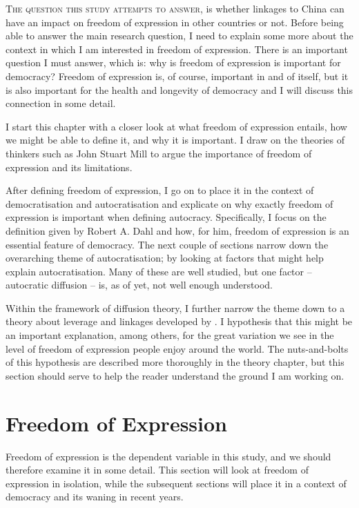 \lettrine{T}{he question this study attempts to answer}, is whether linkages to China can have an impact on freedom of expression in other countries or not. Before being able to answer the main research question, I need to explain some more about the context in which I am interested in freedom of expression. There is an important question I must answer, which is: why is freedom of expression is important for democracy? Freedom of expression is, of course, important in and of itself, but it is also important for the health and longevity of democracy and I will discuss this connection in some detail.  

I start this chapter with a closer look at what freedom of expression entails, how we might be able to define it, and why it is important.  I draw on the theories of thinkers such as John Stuart Mill to argue the importance of freedom of expression and its limitations.

After defining freedom of expression, I go on to place it in the context of democratisation and autocratisation and explicate on why exactly freedom of expression is important when defining autocracy. Specifically, I focus on the definition given by Robert A. Dahl and how, for him, freedom of expression is an essential feature of democracy. The next couple of sections narrow down the overarching theme of autocratisation; by looking at factors that might help explain autocratisation. Many of these are well studied, but one factor -- autocratic diffusion -- is, as of yet, not well enough understood. 

Within the framework of diffusion theory, I further narrow the theme down to a theory about leverage and linkages developed by \citet{levitsky_linkage_2006}. I hypothesis that this might be an important explanation, among others, for the great variation we see in the level of freedom of expression people enjoy around the world. The nuts-and-bolts of this hypothesis are described more thoroughly in the theory chapter, but this section should serve to help the reader understand the ground I am working on. 

\section{Freedom of Expression}
Freedom of expression is the dependent variable in this study, and we should therefore examine it in some detail. This section will look at freedom of expression in isolation, while the subsequent sections will place it in a context of democracy and its waning in recent years. 

